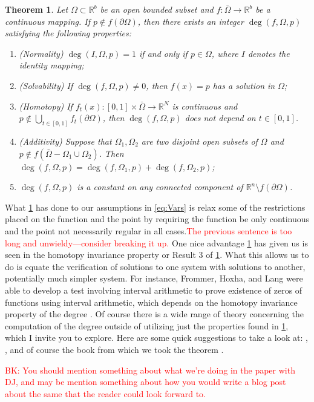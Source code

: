 \documentclass[11pt]{article}
\theoremstyle{plain}
\newtheorem{thm}{Theorem}[section]
\theoremstyle{definition}
\theoremstyle{remark}
\newcommand{\delete}[1]{\textcolor{red}{#1}}
\newcommand{\modified}[1]{\textcolor{darkgrn}{#1}}
\begin{document}
\begin{thm} \label{DegThm}
Let $\Omega\subset\mathbb{R}^b$ be an open bounded subset and $f:\bar{\Omega}\rightarrow\mathbb{R}^b$ be a continuous mapping. If $p\not\in f\left(\partial\Omega\right)$, then there exists an integer $\operatorname{deg}\left(f, \Omega,p\right)$ satisfying the following properties:
\begin{enumerate}
\item (Normality) $\operatorname{deg}\left(I, \Omega,p\right)=1$ if and only if $p\in\Omega$, where $I$ denotes the identity mapping;
\item (Solvability) If $\operatorname{deg}\left(f, \Omega,p\right)\not= 0$, then $f(x)=p$ has a solution in $\Omega$;
\item (Homotopy) If $f_t(x):[0,1]\times\bar{\Omega}\rightarrow\mathbb{R}^N$ is continuous and $p\not\in \bigcup\limits_{t\in[0,1]}f_t\left(\partial\Omega\right)$, then $\operatorname{deg}\left(f, \Omega,p\right)$ does not depend on $t\in[0,1]$. 
\item (Additivity) Suppose that $\Omega_1, \Omega_2$ are two disjoint open subsets of $\Omega$ and $p\not\in f\left(\bar{\Omega}-\Omega_1\cup\Omega_2\right)$. Then $\operatorname{deg}\left(f, \Omega,p\right)=\operatorname{deg}\left(f, \Omega_1,p\right)+\operatorname{deg}\left(f, \Omega_2,p\right)$;
\item $\operatorname{deg}\left(f, \Omega,p\right)$ is a constant on any connected component of $\mathbb{R}^n\setminus f(\partial\Omega)$. 
\end{enumerate}
\end{thm}

What \cref{DegThm} has done to our assumptions in \eqref{eq:Vars} is relax some of \modified{the} restrictions placed on the function and the point by requiring the function be \modified{only} continuous and the point not necessarily regular in all cases.\delete{The previous sentence is too long and unwieldy---consider breaking it up.}
One nice advantage \cref{DegThm} has given us is seen in the homotopy invariance property or \modified{Result} 3 of \cref{DegThm}.
What this allows us to do is equate the verification of solutions to one system with solutions to another, potentially much simpler system.
For instance, Frommer, Hoxha, and Lang were able to develop a test involving interval arithmetic to prove existence of zeros of functions using interval arithmetic, which depends on the homotopy invariance property of the degree \cite{FrHoLa2007}.
Of course there is a wide range of theory concerning the computation of the degree outside of utilizing just the properties found in \cref{DegThm}, which I invite you to explore.
Here are some quick suggestions to take a look at: \cite{MoVrYa2002}, \cite{OnTh2006}, and of course the book from which we took the theorem \cite{OrChCh2006}.


\delete{BK: You should mention something about what we're doing in the paper with DJ, and may be mention something about how you would write a blog post about the same that the reader could look forward to.}
  

\end{document}
